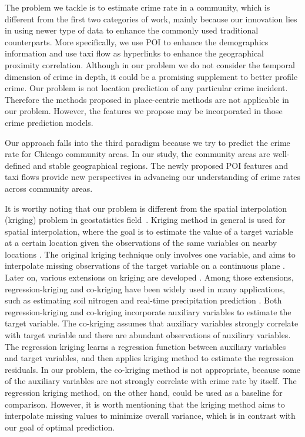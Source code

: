 \smallskip
The problem we tackle is to estimate crime rate in a community, which is different from the first two categories of work, mainly because our innovation lies in using newer type of data to enhance the commonly used traditional counterparts. More specifically, we use POI to enhance the demographics information and use taxi flow as hyperlinks to enhance the geographical proximity correlation. Although in our problem we do not consider the temporal dimension of crime in depth, it could be a promising supplement to better profile crime. Our problem is not location prediction of any particular crime incident. Therefore the methods proposed in place-centric methods are not applicable in our problem. However, the features we propose may be incorporated in those crime prediction models. 

Our approach falls into the third paradigm because we try to predict the crime rate for Chicago community areas. In our study, the community areas are well-defined and stable geographical regions. The newly proposed POI features and taxi flows provide new perspectives in advancing our understanding of crime rates across community areas.


\medskip


It is worthy noting that our problem is different from the spatial interpolation (kriging) problem in geostatistics field~\cite{Ans02}. Kriging method in general is used for spatial interpolation, where the goal is to estimate the value of a target variable at a certain location given the observations of the same variables on nearby locations \cite{OlWe90}. The original kriging technique only involves one variable, and aims to interpolate missing observations of the target variable on a continuous plane \cite{Cres90}. Later on, various extensions on kriging are developed \cite{KBV95}. Among those extensions, regression-kriging \cite{HuWa94} and co-kriging \cite{Myer83, KBCD14} have been widely used in many applications, such as estimating soil nitrogen \cite{WZL13} and real-time precipitation prediction \cite{SGEG14}. Both regression-kriging and co-kriging incorporate auxiliary variables to estimate the target variable. The co-kriging assumes that auxiliary variables strongly correlate with target variable and there are abundant observations of auxiliary variables. The regression kriging learns a regression function between auxiliary variables and target variables, and then applies kriging method to estimate the regression residuals. In our problem, the co-kriging method is not appropriate, because some of the auxiliary variables are not strongly correlate with crime rate by itself. The regression kriging method, on the other hand, could be used as a baseline for comparison. However, it is worth mentioning that the kriging method aims to interpolate missing values to minimize overall variance, which is in contrast with our goal of optimal prediction.



